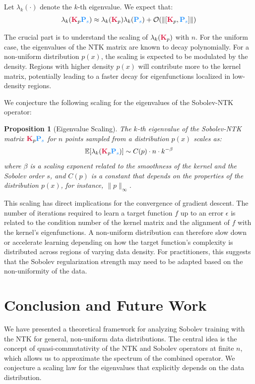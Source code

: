 \documentclass{article}
\newcommand{\K}{\textcolor{kernelcolor}{\mathbf{K}}}
\newcommand{\Ps}{\textcolor{sobolevcolor}{\mathbf{P}_s}}
\newtheorem{proposition}[theorem]{Proposition}
\begin{document}
Let $\lambda_k(\cdot)$ denote the $k$-th eigenvalue. We expect that:
\begin{equation}
    \lambda_k(\K_p \Ps) \approx \lambda_k(\K_p) \lambda_k(\Ps) + \mathcal{O}(\|[\K_p, \Ps]\|)
\end{equation}

The crucial part is to understand the scaling of $\lambda_k(\K_p)$ with $n$. For the uniform case, the eigenvalues of the NTK matrix are known to decay polynomially. For a non-uniform distribution $p(x)$, the scaling is expected to be modulated by the density. Regions with higher density $p(x)$ will contribute more to the kernel matrix, potentially leading to a faster decay for eigenfunctions localized in low-density regions.

We conjecture the following scaling for the eigenvalues of the Sobolev-NTK operator:
\begin{proposition}[Eigenvalue Scaling]
The $k$-th eigenvalue of the Sobolev-NTK matrix $\K_p \Ps$ for $n$ points sampled from a distribution $p(x)$ scales as:
\begin{equation}
    \mathbb{E}[\lambda_k(\K_p \Ps)] \sim C(p) \cdot n \cdot k^{-\beta}
\end{equation}
where $\beta$ is a scaling exponent related to the smoothness of the kernel and the Sobolev order $s$, and $C(p)$ is a constant that depends on the properties of the distribution $p(x)$, for instance, $\|p\|_{\infty}$.
\end{proposition}

This scaling has direct implications for the convergence of gradient descent. The number of iterations required to learn a target function $f$ up to an error $\epsilon$ is related to the condition number of the kernel matrix and the alignment of $f$ with the kernel's eigenfunctions. A non-uniform distribution can therefore slow down or accelerate learning depending on how the target function's complexity is distributed across regions of varying data density. For practitioners, this suggests that the Sobolev regularization strength may need to be adapted based on the non-uniformity of the data.

\section{Conclusion and Future Work}

We have presented a theoretical framework for analyzing Sobolev training with the NTK for general, non-uniform data distributions. The central idea is the concept of quasi-commutativity of the NTK and Sobolev operators at finite $n$, which allows us to approximate the spectrum of the combined operator. We conjecture a scaling law for the eigenvalues that explicitly depends on the data distribution.
\end{document}
